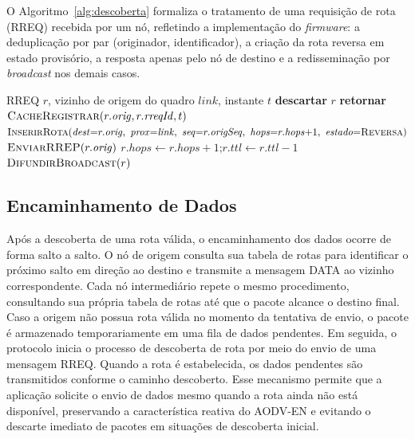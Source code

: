 O Algoritmo~\ref{alg:descoberta} formaliza o tratamento de uma requisição
de rota (RREQ) recebida por um nó, refletindo a implementação do
\emph{firmware}: a deduplicação por par (originador, identificador), a
criação da rota reversa em estado provisório, a resposta apenas pelo nó
de destino e a redisseminação por \emph{broadcast} nos demais casos.

\begin{algorithm}[H]
\caption{Tratamento de RREQ recebido em um nó}\label{alg:descoberta}
\begin{algorithmic}[1]
\Require RREQ $r$, vizinho de origem do quadro $\mathit{link}$, instante $t$
  \State \textbf{descartar} $r$ 
  \State \textbf{retornar}
\EndIf
\State $\Call{CacheRegistrar}{r.\mathit{orig}, r.\mathit{rreqId}, t}$
\State $\Call{InserirRota}{\mathit{dest}{=}r.\mathit{orig},\ \mathit{prox}{=}\mathit{link},\ \mathit{seq}{=}r.\mathit{origSeq},\ \mathit{hops}{=}r.\mathit{hops}{+}1,\ \mathit{estado}{=}\textsc{Reversa}}$
  \State $\Call{EnviarRREP}{r.\mathit{orig}}$ 
\Else
  \State $r.\mathit{hops} \gets r.\mathit{hops} + 1$;\quad $r.\mathit{ttl} \gets r.\mathit{ttl} - 1$
    \State $\Call{DifundirBroadcast}{r}$ 
  \EndIf
\EndIf
\end{algorithmic}
\end{algorithm}

\subsection{Encaminhamento de Dados}\label{encaminhamento-de-dados}

Após a descoberta de uma rota válida, o
encaminhamento dos dados ocorre de forma salto a salto. O nó de origem
consulta sua tabela de rotas para identificar o próximo salto em direção
ao destino e transmite a mensagem DATA ao vizinho correspondente. Cada
nó intermediário repete o mesmo procedimento, consultando sua própria
tabela de rotas até que o pacote alcance o destino final. Caso a origem
não possua rota válida no momento da tentativa de envio, o pacote é
armazenado temporariamente em uma fila de dados pendentes. Em seguida, o
protocolo inicia o processo de descoberta de rota por meio do envio de
uma mensagem RREQ. Quando a rota é estabelecida, os dados pendentes são
transmitidos conforme o caminho descoberto. Esse mecanismo permite que a
aplicação solicite o envio de dados mesmo quando a rota ainda não está
disponível, preservando a característica reativa do AODV-EN e evitando o
descarte imediato de pacotes em situações de descoberta inicial.

